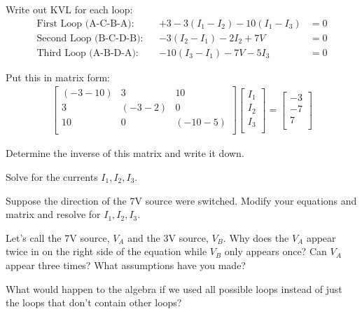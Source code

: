 Write out KVL for each loop:
\begin{align*}
\text{First Loop (A-C-B-A):}&&+3-3(I_1-I_2)-10(I_1-I_3)&=0\\
\text{Second Loop (B-C-D-B):}&&-3(I_2-I_1)-2I_2+7V&=0\\
\text{Third Loop (A-B-D-A):}&&-10(I_3-I_1)-7V-5I_3&=0
\end{align*}

Put this in matrix form:
\begin{align}
\left[ \begin{matrix}
(-3-10)&	3&	10\\
3&	(-3-2)&0\\
10	&	0&	(-10-5)\\
\end{matrix} \right]
\left[ \begin{matrix}
I_1\\
I_2\\
I_3\\
\end{matrix} \right] =
\left[ \begin{matrix}
-3\\
-7\\
7\\
\end{matrix} \right]
\end{align}

\begin{blevel}
Determine the inverse of this matrix and write it down.
\end{blevel}

\begin{clevel}
Solve for the currents $I_1,I_2,I_3$.
\end{clevel}

\begin{clevel}
Suppose the direction of the 7V source were switched. Modify your equations and matrix and resolve for $I_1,I_2,I_3$.
\end{clevel}

\begin{dlevel}
Let's call the 7V source, $V_A$ and the 3V source, $V_B$. Why does the $V_A$ appear twice in on the right side of the equation while $V_B$ only appears once? Can $V_A$ appear three times? What assumptions have you made?
\end{dlevel}

\begin{dlevel}
What would happen to the algebra if we used all possible loops instead of just the loops that don't contain other loops?
\end{dlevel}

